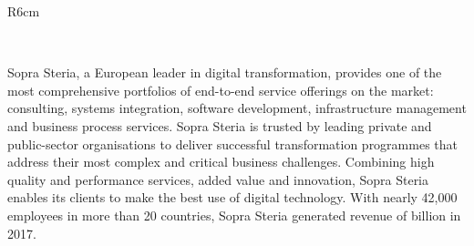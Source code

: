 \documentclass[a4paper,11pt]{article}
\begin{document}



\begin{wrapfigure}{R}{6cm}
\vspace{-2cm}
\hfill {}
\vspace{-1cm}
\end{wrapfigure}

\ 


Sopra Steria, a European leader in digital transformation, provides one of the most comprehensive portfolios of end-to-end service offerings on the market: consulting, systems integration, software development, infrastructure management and business process services. Sopra Steria is trusted by leading private and public-sector organisations to deliver successful transformation programmes that address their most complex and critical business challenges. Combining high quality and performance services, added value and innovation, Sopra Steria enables its clients to make the best use of digital technology. With nearly 42,000 employees in more than 20 countries, Sopra Steria generated revenue of  billion in 2017.




\end{document}
